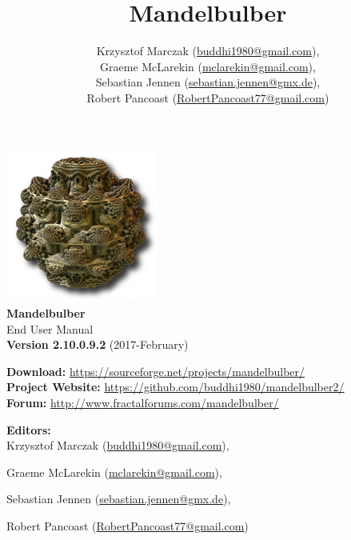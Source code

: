 % 
%




\newcommand{\mTitle}{Mandelbulber}
\newcommand{\mSubtitle}{End User Manual}
\newcommand{\mVersionDocument}{2.10.0.9.2}
\newcommand{\mDateDocument}{2017-February}
\newcommand{\mAuthor}{
	
Krzysztof Marczak (\href{mailto:buddhi1980@gmail.com}{buddhi1980@gmail.com}),

Graeme McLarekin (\href{mailto:mclarekin@gmail.com}{mclarekin@gmail.com}),

Sebastian Jennen (\href{mailto:sebastian.jennen@gmx.de}{sebastian.jennen@gmx.de}),

Robert Pancoast (\href{mailto:RobertPancoast77@gmail.com}{RobertPancoast77@gmail.com})}


\title{\mTitle}
\author{\mAuthor}




\begin{titlepage}
	\begin{center}
		\vspace{1.5cm}
			\includegraphics[width=5cm]{img/mandelbulber_logo.png} \\
		\vspace{0.5cm}
		\Huge\textbf{\mTitle}\\
		\Huge\mSubtitle\\
		\vspace{1.5cm}
		\large\textbf{Version \mVersionDocument} (\mDateDocument)\\
	\end{center}
	\normalsize
	\begin{flushleft}
			\textbf{Download:} \url{https://sourceforge.net/projects/mandelbulber/}\\
			\textbf{Project Website:} \url{https://github.com/buddhi1980/mandelbulber2/}\\
			\textbf{Forum:} \url{http://www.fractalforums.com/mandelbulber/}\\
	\end{flushleft}
	\vspace{2cm}
	\textbf{Editors:}\\
	\mAuthor\\
	\vfill
\end{titlepage}

